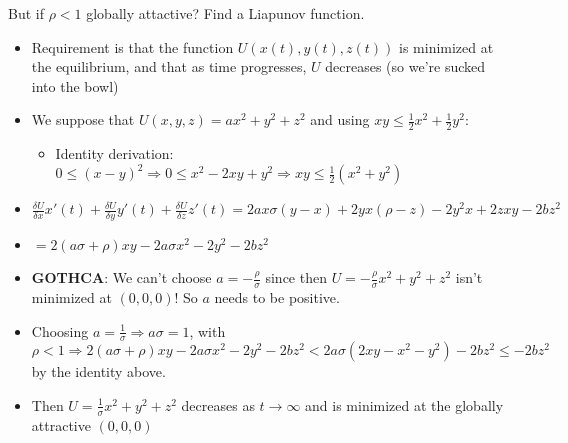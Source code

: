\documentclass[11pt, oneside]{article}   	%
\begin{document}
But if $\rho < 1$ globally attactive?  Find a Liapunov function.

\begin{itemize}
\item Requirement is that the function $U(x(t), y(t), z(t))$ is minimized at the equilibrium, and that as time progresses, $U$ decreases (so we're sucked into the bowl)
\item We suppose that $U(x,y,z) = ax^2 + y^2 + z^2$ and using $xy \leq \frac{1}{2}x^2+ \frac{1}{2}y^2$:
\begin{itemize}
\item Identity derivation: $0 \leq (x-y)^2 \Rightarrow 0 \leq x^2 -2xy + y^2 \Rightarrow xy \leq \frac{1}{2}(x^2 + y^2)$
\end{itemize}
\item $\frac{\delta U}{\delta x} x'(t)+ \frac{\delta U}{\delta y} y'(t)+ \frac{\delta U}{\delta z}z'(t) = 2ax\sigma (y -x) + 2yx(\rho - z)-2y^2x+2zxy-2bz^2$
\item $=2(a\sigma + \rho)xy - 2a\sigma x^2 -2y^2-2bz^2$
\item \textbf{GOTHCA}: We can't choose $a = -\frac{\rho}{\sigma}$ since then $U = -\frac{\rho}{\sigma}x^2+y^2+z^2$ isn't minimized at $(0,0,0)$!  So $a$ needs to be positive.
\item Choosing $a = \frac{1}{\sigma} \Rightarrow a\sigma = 1$, with $\rho < 1 \Rightarrow
2(a\sigma + \rho)xy - 2a\sigma x^2 -2y^2-2bz^2 < 2a\sigma(2xy - x^2-y^2) - 2bz^2 \leq -2bz^2$ by the identity above.
\item Then $U = \frac{1}{\sigma}x^2+y^2+z^2$ decreases as $t \rightarrow \infty$ and is minimized at the globally attractive $(0, 0, 0)$
\end{itemize}
\end{document}
